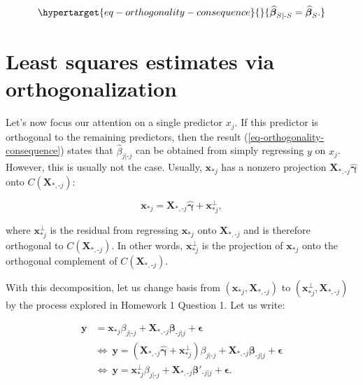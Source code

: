 \documentclass[
  11pt,
  letterpaper,
  oneside]{book}
\theoremstyle{definition}
\theoremstyle{plain}
\theoremstyle{plain}
\theoremstyle{plain}
\theoremstyle{remark}
\begin{document}
\begin{equation}\protect\hypertarget{eq-orthogonality-consequence}{}{
\boldsymbol{\widehat{\beta}}_{S|\text{-}S} = \boldsymbol{\widehat{\beta}}_{S}.
}\label{eq-orthogonality-consequence}\end{equation}

\hypertarget{least-squares-estimates-via-orthogonalization}{%
\section{Least squares estimates via
orthogonalization}\label{least-squares-estimates-via-orthogonalization}}

Let's now focus our attention on a single predictor \(x_j\). If this
predictor is orthogonal to the remaining predictors, then the result
(\ref{eq-orthogonality-consequence}) states that
\(\widehat{\beta}_{j|\text{-}j}\) can be obtained from simply regressing
\(y\) on \(x_j\). However, this is usually not the case. Usually,
\(\boldsymbol{x}_{*j}\) has a nonzero projection
\(\boldsymbol{X}_{*,\text{-}j}\boldsymbol{\widehat{\gamma}}\) onto
\(C(\boldsymbol{X}_{*,\text{-}j})\):

\[
\boldsymbol{x}_{*j} = \boldsymbol{X}_{*,\text{-}j}\boldsymbol{\widehat{\gamma}} + \boldsymbol{x}^{\perp}_{*j},
\]

where \(\boldsymbol{x}^{\perp}_{*j}\) is the residual from regressing
\(\boldsymbol{x}_{*j}\) onto \(\boldsymbol{X}_{*,\text{-}j}\) and is
therefore orthogonal to \(C(\boldsymbol{X}_{*,\text{-}j})\). In other
words, \(\boldsymbol{x}^{\perp}_{*j}\) is the projection of
\(\boldsymbol{x}_{*j}\) onto the orthogonal complement of
\(C(\boldsymbol{X}_{*,\text{-}j})\).

With this decomposition, let us change basis from
\((\boldsymbol{x}_{*j}, \boldsymbol{X}_{*,\text{-}j})\) to
\((\boldsymbol{x}^{\perp}_{*j}, \boldsymbol{X}_{*,\text{-}j})\) by the
process explored in Homework 1 Question 1. Let us write:

\[
\begin{aligned}
\boldsymbol{y} &= \boldsymbol{x}_{*j} \beta_{j|\text{-}j} + \boldsymbol{X}_{*,\text{-}j}\boldsymbol{\beta}_{\text{-}j|j} + \boldsymbol{\epsilon} \\
&\Longleftrightarrow \ \boldsymbol{y} = (\boldsymbol{X}_{*,\text{-}j}\boldsymbol{\widehat{\gamma}} + \boldsymbol{x}^{\perp}_{*j})\beta_{j|\text{-}j} + \boldsymbol{X}_{*,\text{-}j}\boldsymbol{\beta}_{\text{-}j|j} + \boldsymbol{\epsilon} \\
&\Longleftrightarrow \ \boldsymbol{y} = \boldsymbol{x}^{\perp}_{*j}\beta_{j|\text{-}j} + \boldsymbol{X}_{*,\text{-}j}\boldsymbol{\beta}'_{\text{-}j|j} + \boldsymbol{\epsilon}.
\end{aligned}
\]
\end{document}
